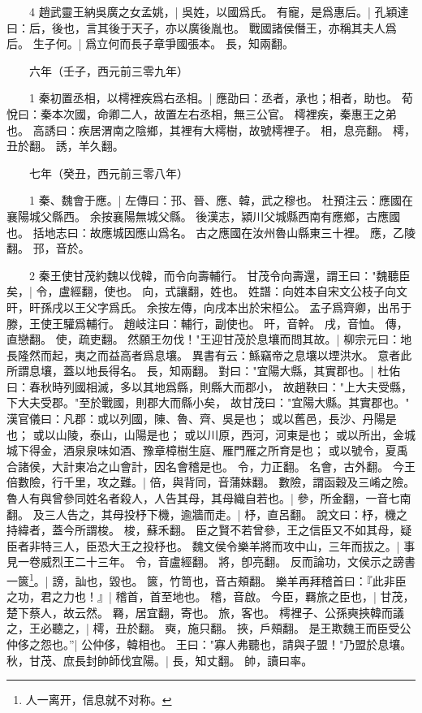 　　4 趙武靈王納吳廣之女孟姚，|{
	吳姓，以國爲氏。
}
有寵，是爲惠后。|{
	孔穎達曰：后，後也，言其後于天子，亦以廣後胤也。
	戰國諸侯僭王，亦稱其夫人爲后。
}
生子何。|{
	爲立何而長子章爭國張本。
	長，知兩翻。
}

　　六年（壬子，西元前三零九年）

　　1 秦初置丞相，以樗裡疾爲右丞相。|{
	應劭曰：丞者，承也；相者，助也。
	荀悅曰：秦本次國，命卿二人，故置左右丞相，無三公官。
	樗裡疾，秦惠王之弟也。
	高誘曰：疾居渭南之陰鄉，其裡有大樗樹，故號樗裡子。
	相，息亮翻。
	樗，丑於翻。
	誘，羊久翻。
}

　　七年（癸丑，西元前三零八年）

　　1 秦、魏會于應。|{
	左傳曰：邘、晉、應、韓，武之穆也。
	杜預注云：應國在襄陽城父縣西。
	余按襄陽無城父縣。
	後漢志，潁川父城縣西南有應鄉，古應國也。
	括地志曰：故應城因應山爲名。
	古之應國在汝州魯山縣東三十裡。
	應，乙陵翻。
	邘，音於。
}

　　2 秦王使甘茂約魏以伐韓，而令向壽輔行。
	甘茂令向壽還，謂王曰："魏聽臣矣，|{
	令，盧經翻，使也。
	向，式讓翻，姓也。
	姓譜：向姓本自宋文公枝子向文旰，旰孫戌以王父字爲氏。
	余按左傳，向戌本出於宋桓公。
	孟子爲齊卿，出吊于滕，王使王驩爲輔行。
	趙岐注曰：輔行，副使也。
	旰，音幹。
	戌，音恤。
	傳，直戀翻。
	使，疏吏翻。
}
然願王勿伐！"王迎甘茂於息壤而問其故。|{
	柳宗元曰：地長隆然而起，夷之而益高者爲息壤。
	異書有云：鯀竊帝之息壤以堙洪水。
	意者此所謂息壤，蓋以地長得名。
	長，知兩翻。
}
對曰："宜陽大縣，其實郡也。|{
	杜佑曰：春秋時列國相滅，多以其地爲縣，則縣大而郡小，
	故趙鞅曰："上大夫受縣，下大夫受郡。"至於戰國，則郡大而縣小矣，
	故甘茂曰："宜陽大縣。其實郡也。"
	漢官儀曰：凡郡：或以列國，陳、魯、齊、吳是也；
	或以舊邑，長沙、丹陽是也；
	或以山陵，泰山，山陽是也；
	或以川原，西河，河東是也；
	或以所出，金城城下得金，酒泉泉味如酒、豫章樟樹生庭、雁門雁之所育是也；
	或以號令，夏禹合諸侯，大計東冶之山會計，因名會稽是也。
	令，力正翻。
	名會，古外翻。
}
今王倍數險，行千里，攻之難。|{
	倍，與背同，音蒲妹翻。
	數險，謂函穀及三崤之險。
}
魯人有與曾參同姓名者殺人，人告其母，其母織自若也。|{
	參，所金翻，一音七南翻。
}
及三人告之，其母投杼下機，逾牆而走。|{
	杼，直呂翻。
	說文曰：杼，機之持緯者，蓋今所謂梭。
	梭，蘇禾翻。
}
臣之賢不若曾參，王之信臣又不如其母，疑臣者非特三人，臣恐大王之投杼也。
	魏文侯令樂羊將而攻中山，三年而拔之。|{
	事見一卷威烈王二十三年。
	令，音盧經翻。
	將，卽亮翻。
}
反而論功，文侯示之謗書一篋\footnote{人一离开，信息就不对称。}。|{
	謗，訕也，毀也。
	篋，竹笥也，音古頰翻。
}
樂羊再拜稽首曰：『此非臣之功，君之力也！』|{
	稽首，首至地也。
	稽，音啟。
}
今臣，羇旅之臣也，|{
	甘茂，楚下蔡人，故云然。
	羇，居宜翻，寄也。
	旅，客也。
}
樗裡子、公孫奭挾韓而議之，王必聽之，|{
	樗，丑於翻。
	奭，施只翻。
	挾，戶頰翻。
}
是王欺魏王而臣受公仲侈之怨也。”|{
	公仲侈，韓相也。
}
王曰："寡人弗聽也，請與子盟！"乃盟於息壤。
	秋，甘茂、庶長封帥師伐宜陽。|{
	長，知丈翻。
	帥，讀曰率。
}

